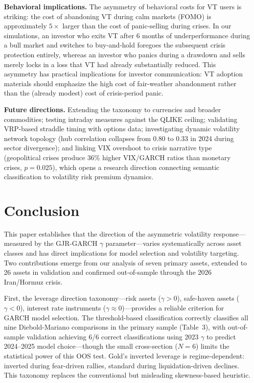 \textbf{Behavioral implications.} The asymmetry of behavioral costs for VT users is striking: the cost of abandoning VT during calm markets (FOMO) is approximately $5\times$ larger than the cost of panic-selling during crises. In our simulations, an investor who exits VT after 6 months of underperformance during a bull market and switches to buy-and-hold foregoes the subsequent crisis protection entirely, whereas an investor who panics during a drawdown and sells merely locks in a loss that VT had already substantially reduced. This asymmetry has practical implications for investor communication: VT adoption materials should emphasize the high cost of fair-weather abandonment rather than the (already modest) cost of crisis-period panic.

\textbf{Future directions.} Extending the taxonomy to currencies and broader commodities; testing intraday measures against the QLIKE ceiling; validating VRP-based straddle timing with options data; investigating dynamic volatility network topology (hub correlation collapses from 0.80 to 0.33 in 2024 during sector divergence); and linking VIX overshoot to crisis narrative type (geopolitical crises produce 36\% higher VIX/GARCH ratios than monetary crises, $p = 0.025$), which opens a research direction connecting semantic classification to volatility risk premium dynamics.



\section{Conclusion}

This paper establishes that the direction of the asymmetric volatility response---measured by the GJR-GARCH $\gamma$ parameter---varies systematically across asset classes and has direct implications for model selection and volatility targeting. Two contributions emerge from our analysis of seven primary assets, extended to 26 assets in validation and confirmed out-of-sample through the 2026 Iran/Hormuz crisis.

First, the leverage direction taxonomy---risk assets ($\gamma > 0$), safe-haven assets ($\gamma < 0$), interest rate instruments ($\gamma \approx 0$)---provides a reliable criterion for GARCH model selection. The threshold-based classification correctly classifies all nine Diebold-Mariano comparisons in the primary sample (Table~3), with out-of-sample validation achieving 6/6 correct classifications using 2023 $\gamma$ to predict 2024--2025 model choice---though the small cross-section ($N = 6$) limits the statistical power of this OOS test. Gold's inverted leverage is regime-dependent: inverted during fear-driven rallies, standard during liquidation-driven declines. This taxonomy replaces the conventional but misleading skewness-based heuristic.

